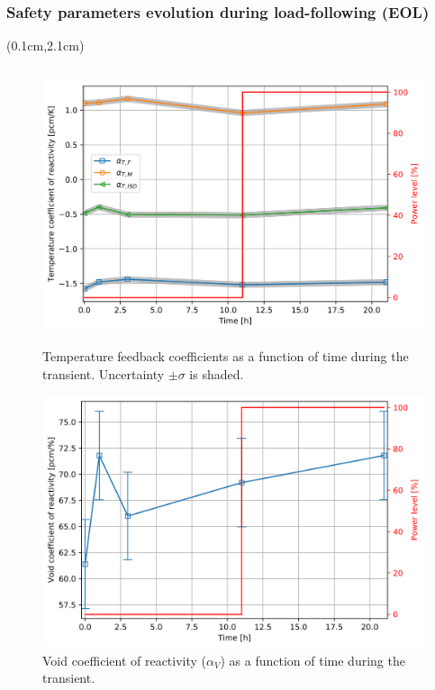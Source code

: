 \begin{frame}
\frametitle{Safety parameters evolution during load-following (EOL)}
\begin{textblock*}{12.5cm}(0.1cm,2.1cm) %
	\begin{columns}
		\column[t]{6.3cm}
		\begin{figure}[t]
			\begin{overprint}
	\includegraphics[width=1.15\linewidth]{../dissertation/figures/ch5/saf_par/tc_evo.png}
	\vspace{-6mm}
	\caption{Temperature feedback coefficients as a function of time during 
	the transient. 
	Uncertainty $\pm\sigma$ is shaded.}
	\includegraphics[width=1.15\linewidth]{../dissertation/figures/ch5/saf_par/void_evo.png}
	\vspace{-6mm}
	\caption{Void coefficient of reactivity ($\alpha_V$) as a function of time 
	during the transient.}

\end{overprint}
\end{figure}
\end{columns}
\end{textblock*}
\end{frame}
